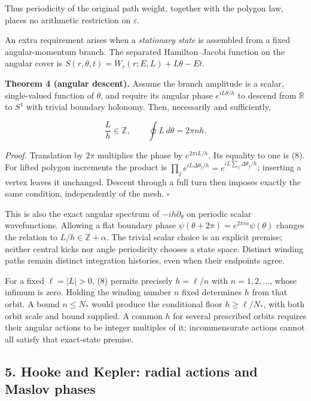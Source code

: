\documentclass[11pt,a4paper]{article}
\begin{document}
Thus periodicity of the original path weight, together with the polygon
law, places no arithmetic restriction on \(\varepsilon\).

An extra requirement arises when a \emph{stationary state} is assembled
from a fixed angular-momentum branch. The separated Hamilton--Jacobi
function on the angular cover is
\(S(r,\theta,t)=W_r(r;E,L)+L\theta-Et\).

\textbf{Theorem 4 (angular descent).} Assume the branch amplitude is a
scalar, single-valued function of \(\theta\), and require its angular
phase \(e^{iL\theta/h}\) to descend from \(\mathbb R\) to \(S^1\) with
trivial boundary holonomy. Then, necessarily and sufficiently,

\[
\frac Lh\in\mathbb Z,
\qquad \oint L\,d\theta=2\pi n h. \tag{8}
\]

\emph{Proof.} Translation by \(2\pi\) multiplies the phase by
\(e^{2\pi iL/h}\). Its equality to one is (8). For lifted polygon
increments the product is
\(\prod_j e^{iL\Delta\theta_j/h}=e^{iL\sum_j\Delta\theta_j/h}\);
inserting a vertex leaves it unchanged. Descent through a full turn then
imposes exactly the same condition, independently of the mesh.
\(\square\)

This is also the exact angular spectrum of \(-ih\partial_\theta\) on
periodic scalar wavefunctions. Allowing a flat boundary phase
\(\psi(\theta+2\pi)=e^{2\pi i\alpha}\psi(\theta)\) changes the relation
to \(L/h\in\mathbb Z+\alpha\). The trivial scalar choice is an explicit
premise; neither central kicks nor angle periodicity chooses a state
space. Distinct winding paths remain distinct integration histories,
even when their endpoints agree.

For a fixed \(\ell=|L|>0\), (8) permits precisely \(h=\ell/n\) with
\(n=1,2,\ldots\), whose infimum is zero. Holding the winding number
\(n\) fixed determines \(h\) from that orbit. A bound \(n\le N_*\) would
produce the conditional floor \(h\ge\ell/N_*\), with both orbit scale
and bound supplied. A common \(h\) for several prescribed orbits
requires their angular actions to be integer multiples of it;
incommensurate actions cannot all satisfy that exact-state premise.

\hypertarget{hooke-and-kepler-radial-actions-and-maslov-phases}{%
\subsection{5. Hooke and Kepler: radial actions and Maslov
phases}\label{hooke-and-kepler-radial-actions-and-maslov-phases}}
\end{document}
